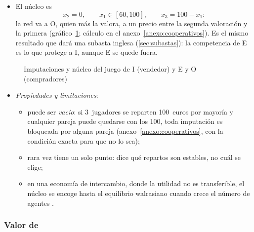 \documentclass[11pt]{article}
\begin{document}
\begin{itemize}
\begin{itemize}
    \begin{itemize}
    \item \textup{I} y O juntos consiguen los 100: $x_1+x_3\geq100$ obliga a $x_2=0$, y E no recibe nada;
    \item \textup{I} y E juntos consiguen 60: $x_1+x_2\geq60$ obliga a $x_1\geq60$, porque si \textup{I} recibiera menos se iría con E, y
    \item las demás condiciones no añaden nada.
    \end{itemize}
  \item El núcleo es
\[
x_2=0,\qquad x_1\in[60,100],\qquad x_3=100-x_1:
\]
  la red va a O, quien más la valora, a un precio entre la segunda valoración y la primera (gráfico~\ref{fig:nucleo}; cálculo en el anexo~\ref{anexo:cooperativos}). Es el mismo resultado que dará una subasta inglesa (\ref{sec:subastas}): la competencia de E es lo que protege a \textup{I}, aunque E se quede fuera.
  \end{itemize}
\end{itemize}

\begin{figure}[H]
\centering
\caption{Imputaciones y núcleo del juego de \textup{I} (vendedor) y E y O (compradores)}\label{fig:nucleo}
\end{figure}

\begin{itemize}
\item \emph{Propiedades y limitaciones}:
  \begin{itemize}
  \item puede ser \emph{vacío}: si 3~jugadores se reparten 100~euros por mayoría y cualquier pareja puede quedarse con los 100, toda imputación es bloqueada por alguna pareja (anexo~\ref{anexo:cooperativos}, con la condición exacta para que no lo sea);
  \item rara vez tiene un solo punto: dice qué repartos son estables, no cuál se elige;
  \item en una economía de intercambio, donde la utilidad no es transferible, el núcleo se encoge hasta el equilibrio walrasiano cuando crece el número de agentes\nocite{DebreuScarf1963Limit} .
  \end{itemize}
\end{itemize}

\subsubsection{Valor de }\label{sec:shapley}
\end{document}
